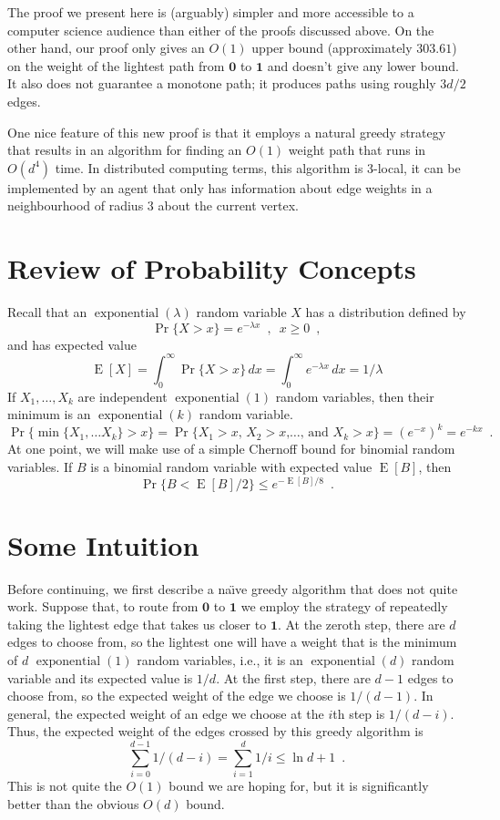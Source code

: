 \documentclass[a4paper,UKenglish]{lipics-v2016}
\DeclareMathOperator{\E}{E}
\DeclareMathOperator{\exponential}{exponential}
\newcommand{\zero}{\mathbf{0}}
\newcommand{\one}{\mathbf{1}}
\begin{document}
The proof we present here is (arguably) simpler and more accessible
to a computer science audience than either of the proofs discussed
above.  On the other hand, our proof only gives an $O(1)$ upper bound
(approximately $303.61$) on the weight of the lightest path from $\zero$
to $\one$ and doesn't give any lower bound.  It also does not guarantee
a monotone path; it produces paths using roughly $3d/2$ edges.

One nice feature of this new proof is that it employs a natural greedy
strategy that results in an algorithm for finding an $O(1)$ weight
path that runs in $O(d^4)$ time.  In distributed computing terms, this
algorithm is 3-local, it can be implemented by an agent that only has
information about edge weights in a neighbourhood of radius 3 about the
current vertex.

\section{Review of Probability Concepts}

Recall that an $\exponential(\lambda)$ random variable $X$ has a
distribution defined by
\[
   \Pr\{X > x\} = e^{-\lambda x} \enspace,\enspace x \ge 0 \enspace ,
\]
and has expected value
\[
   \E[X] = \int_0^\infty \Pr\{X>x\}\,dx = \int_0^\infty e^{-\lambda x}\,dx = 1/\lambda
\]
If $X_1,\ldots,X_k$ are independent $\exponential(1)$ random variables,
then their minimum is an $\exponential(k)$ random variable.
\[
   \Pr\{\min\{X_1,\ldots X_k\} > x\} = \Pr\{\text{$X_1>x$, $X_2>x$,\ldots, and $X_k>x$}\} = \left(e^{-x}\right)^k = e^{-kx} \enspace .
\]
At one point, we will make use of a simple Chernoff bound for binomial
random variables. If $B$ is a binomial random variable with expected
value $\E[B]$, then
\begin{equation}\label{eq:chernoff}
   \Pr\{B < \E[B]/2\} \le e^{-\E[B]/8} \enspace .
\end{equation}

\section{Some Intuition}
\label{sec:intuition}

Before continuing, we first describe a na\"{\i}ve greedy algorithm that
does not quite work.  Suppose that, to route from $\zero$ to $\one$ we
employ the strategy of repeatedly taking the lightest edge that
takes us closer to $\one$.  At the zeroth step, there are $d$ edges to
choose from, so the lightest one will have a weight that is the minimum of
$d$ $\exponential(1)$ random variables, i.e., it is an $\exponential(d)$
random variable and its expected value is $1/d$.  At the first step,
there are $d-1$ edges to choose from, so the expected weight of the edge
we choose is $1/(d-1)$. In general, the expected weight of an edge we
choose at the $i$th step is $1/(d-i)$.  Thus, the expected weight of
the edges crossed by this greedy algorithm is
\[
   \sum_{i=0}^{d-1} 1/(d-i) = \sum_{i=1}^d 1/i \le \ln d + 1 \enspace . 
\]
This is not quite the $O(1)$ bound we are hoping for, but it is significantly better than the obvious $O(d)$ bound.
\end{document}
